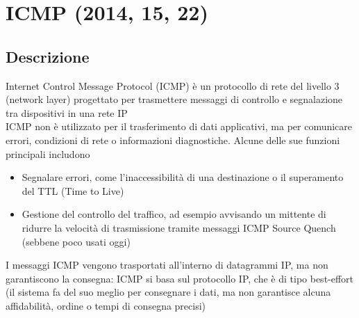 \documentclass[10pt,oneside,a4paper]{article}
\begin{document}
\section{ICMP (2014, 15, 22)}
\subsection{Descrizione}
Internet Control Message Protocol (ICMP) è un protocollo di rete del livello 3 (network layer) progettato per trasmettere messaggi di controllo e segnalazione tra dispositivi in una rete IP\\
ICMP non è utilizzato per il trasferimento di dati applicativi, ma per comunicare errori, condizioni di rete o informazioni diagnostiche. Alcune delle sue funzioni principali includono
\begin{itemize}
\item Segnalare errori, come l'inaccessibilità di una destinazione o il superamento del TTL (Time to Live)
\item Gestione del controllo del traffico, ad esempio avvisando un mittente di ridurre la velocità di trasmissione tramite messaggi ICMP Source Quench (sebbene poco usati oggi)
\end{itemize}
I messaggi ICMP vengono trasportati all'interno di datagrammi IP, ma non garantiscono la consegna: ICMP si basa sul protocollo IP, che è di tipo best-effort (il sistema fa del suo meglio per consegnare i dati, ma non garantisce alcuna affidabilità, ordine o tempi di consegna precisi)
\end{document}

